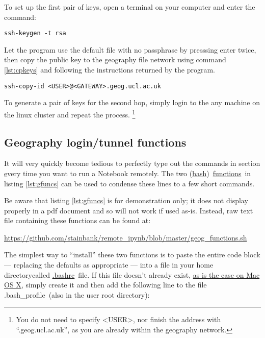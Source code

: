 \documentclass[a4paper]{article}
\begin{document}
To set up the first pair of keys, open a terminal on your computer and enter the command:
\begin{lstlisting}[caption={Generate SSH keys}, label={lst:genkeys}]
ssh-keygen -t rsa
\end{lstlisting}
Let the program use the default file with no passphrase by presssing enter twice, then copy the public key to the geography file network using command \ref{lst:cpkeys} and following the instructions returned by the program.

\begin{lstlisting}[caption={Copy public key to geography file system}, label={lst:cpkeys}]
ssh-copy-id <USER>@<GATEWAY>.geog.ucl.ac.uk
\end{lstlisting}

To generate a pair of keys for the second hop, simply login to the any machine on the linux cluster and repeat the process.
\footnote{You do not need to specify \textless{}USER\textgreater{}, nor finish the address with ``.geog.ucl.ac.uk'', as you are already within the geography network.}

\subsection{Geography login/tunnel functions}
\label{sec:gfuncs}

It will very quickly become tedious to perfectly type out the commands in section \href{sec:manual} every time you want to run a Notebook remotely.
The two (\href{http://cs.lmu.edu/~ray/notes/bash/}{bash})~\href{https://www.shellscript.sh/functions.html}{functions}~in listing \ref{lst:gfuncs} can be used to condense these lines to a few short commands.



Be aware that listing \ref{lst:gfuncs} is for demonstration only; it does not display properly in a pdf document and so will not work if used as-is.
Instead, raw text file containing these functions can be found at:
{}

\noindent\url{https://github.com/stainbank/remote_ipynb/blob/master/geog_functions.sh}
{}

The simplest way to ``install'' these two functions is to paste the entire code block --- replacing the defaults as appropriate --- into a file in your home directorycalled \href{http://superuser.com/questions/49289/what-is-the-bashrc-file}{.bashrc}~file.
If this file doesn't already exist, \href{http://apple.stackexchange.com/a/119714}{as is the case on Mac OS X}, simply create it and then add the following line to the file .bash\_profile~(also in the user root directory):
\end{document}
